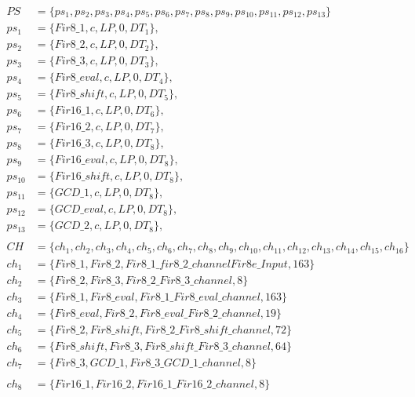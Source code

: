 \begin{align*}
    PS &= \{ ps_1, ps_2, ps_3, ps_4, ps_5, ps_6, ps_7, ps_8, ps_9, ps_{10}, ps_{11}, ps_{12}, ps_{13} \} & & \\
    ps_1 &= \{ Fir8\_1, c, LP, 0, DT_1 \}, \\         %
    ps_2 &= \{ Fir8\_2, c, LP, 0, DT_2 \}, \\         %
    ps_3 &= \{ Fir8\_3, c, LP, 0, DT_3 \},  \\        %
    ps_4 &= \{ Fir8\_eval, c, LP, 0, DT_4 \}, \\      %
    ps_5 &= \{ Fir8\_shift, c, LP, 0, DT_5 \}, \\     %
    ps_6 &= \{ Fir16\_1,c, LP, 0, DT_6 \}, \\         %
    ps_7 &= \{ Fir16\_2, c, LP, 0, DT_7 \}, \\        %
    ps_8 &= \{ Fir16\_3, c, LP, 0, DT_8 \}, \\        %
    ps_9 &= \{ Fir16\_eval, c, LP, 0, DT_8 \}, \\    %
    ps_{10} &= \{ Fir16\_shift, c, LP, 0, DT_8 \}, \\  %
    ps_{11} &= \{ GCD\_1, c, LP, 0, DT_8 \}, \\        %
    ps_{12} &= \{ GCD\_eval, c, LP, 0, DT_8 \}, \\     %
    ps_{13} &= \{ GCD\_2, c, LP, 0, DT_8 \}, \\        %
    \\
    CH &= \{ ch_1, ch_2, ch_3, ch_4, ch_5, ch_6, ch_7, ch_8, ch_9, ch_{10}, ch_{11}, ch_{12}, ch_{13}, ch_{14}, ch_{15}, ch_{16} \} \\
    ch_1 &= \{ Fir8\_1, Fir8\_2, Fir8\_1\_fir8\_2\_channel   Fir8e\_Input, 163 \} \\
    ch_2 &= \{ Fir8\_2, Fir8\_3, Fir8\_2\_Fir8\_3\_channel, 8 \} \\
    ch_3 &= \{ Fir8\_1, Fir8\_eval, Fir8\_1\_Fir8\_eval\_channel, 163 \} \\
    ch_4 &= \{ Fir8\_eval, Fir8\_2, Fir8\_eval\_Fir8\_2\_channel, 19 \} \\
    ch_5 &= \{ Fir8\_2, Fir8\_shift, Fir8\_2\_Fir8\_shift\_channel, 72 \}  \\
    ch_6 &= \{ Fir8\_shift, Fir8\_3, Fir8\_shift\_Fir8\_3\_channel, 64 \} \\
    ch_7 &= \{ Fir8\_3, GCD\_1, Fir8\_3\_GCD\_1\_channel, 8 \} \\
    \\   
    ch_8 &= \{ Fir16\_1, Fir16\_2, Fir16\_1\_Fir16\_2\_channel, 8 \} \\

\end{align*}
